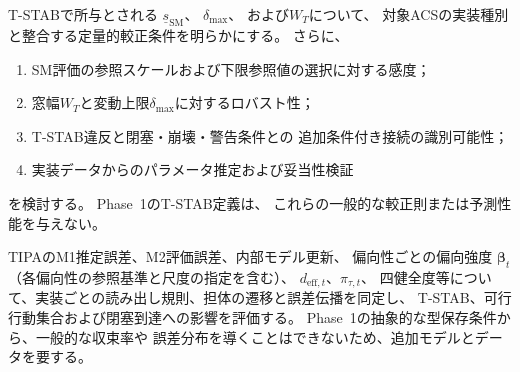 \begin{problem}[T-STABパラメータの較正と予測的解釈]
\label{prob:stability}
T-STABで所与とされる
$\underline{s}_{\mathrm{SM}}$、
$\delta_{\max}$、
および$W_T$について、
対象ACSの実装種別と整合する定量的較正条件を明らかにする。
さらに、
\begin{enumerate}
  \item SM評価の参照スケールおよび下限参照値の選択に対する感度；
  \item 窓幅$W_T$と変動上限$\delta_{\max}$に対するロバスト性；
  \item T-STAB違反と閉塞・崩壊・警告条件との
  追加条件付き接続の識別可能性；
  \item 実装データからのパラメータ推定および妥当性検証
\end{enumerate}
を検討する。
Phase~1のT-STAB定義は、
これらの一般的な較正則または予測性能を与えない。
\end{problem}

\begin{problem}[推定誤差と内部更新則の定量的同定]
\label{prob:estimation_error}
TIPAのM1推定誤差、M2評価誤差、内部モデル更新、
偏向性ごとの偏向強度 $\boldsymbol{\beta}_t$（各偏向性の参照基準と尺度の指定を含む）、
$d_{\mathrm{eff},t}$、$\pi_{\tau,t}$、
四健全度等について、実装ごとの読み出し規則、担体の遷移と誤差伝播を同定し、
T-STAB、可行行動集合および閉塞到達への影響を評価する。
Phase~1の抽象的な型保存条件から、一般的な収束率や
誤差分布を導くことはできないため、追加モデルとデータを要する。
\end{problem}

